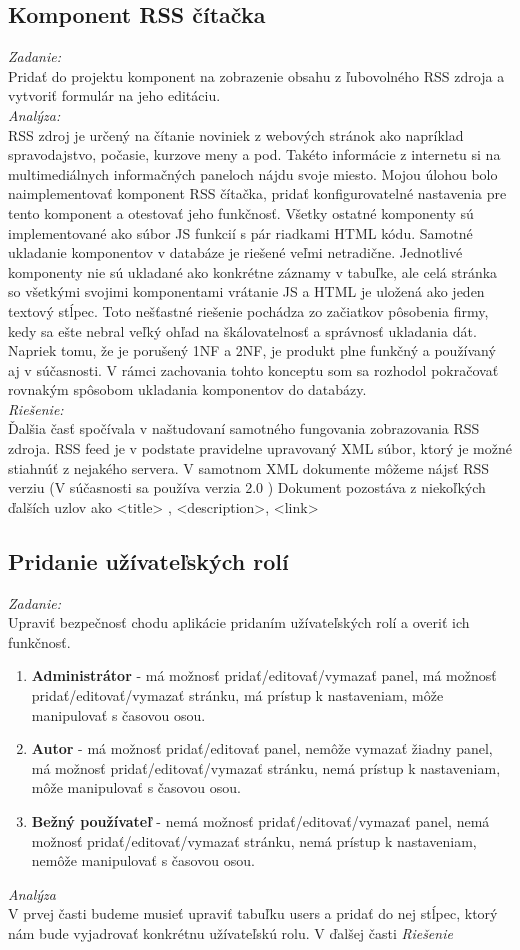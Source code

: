 \documentclass[11pt, oneside]{report}
\begin{document}
\subsection*{Komponent RSS čítačka}
\textit{Zadanie:}\\
Pridať do projektu  komponent na zobrazenie obsahu z ľubovolného RSS zdroja a vytvoriť formulár na jeho editáciu.
\\\textit{Analýza:}\\
 RSS zdroj   je určený na čítanie noviniek  z webových stránok ako napríklad spravodajstvo, počasie, kurzove meny a pod. Takéto informácie  z internetu si na multimediálnych informačných paneloch nájdu svoje miesto. Mojou úlohou bolo naimplementovať komponent RSS čítačka, pridať  konfigurovatelné nastavenia pre tento komponent a otestovať jeho funkčnosť.
Všetky ostatné komponenty sú implementované ako súbor JS funkcií s pár riadkami HTML kódu. Samotné ukladanie komponentov v databáze je riešené veľmi netradične. Jednotlivé komponenty nie sú ukladané ako konkrétne záznamy v tabuľke, ale celá stránka  so všetkými svojimi komponentami vrátanie JS a HTML je uložená ako jeden textový stĺpec. Toto nešťastné riešenie  pochádza  zo začiatkov pôsobenia firmy, kedy sa ešte nebral veľký ohľad na  škálovatelnosť a  správnosť ukladania dát. 
Napriek tomu, že je porušený 1NF a 2NF, je produkt plne funkčný a používaný aj v súčasnosti. V rámci zachovania tohto konceptu som sa rozhodol pokračovať rovnakým spôsobom ukladania komponentov do databázy.
\\\textit{Riešenie:}\\
Ďalšia časť spočívala v naštudovaní samotného fungovania zobrazovania RSS zdroja. RSS feed je v podstate pravidelne upravovaný XML súbor, ktorý je možné stiahnúť z nejakého servera. V samotnom XML dokumente môžeme nájsť RSS verziu (V súčasnosti sa používa verzia 2.0 ) Dokument pozostáva z niekoľkých ďalších uzlov ako <title> , <description>, <link>
\subsection*{Pridanie užívateľských rolí}
\textit{Zadanie:}\\
Upraviť bezpečnosť chodu aplikácie pridaním užívateľských rolí a overiť ich funkčnosť.
\begin{enumerate}
\item \textbf{Administrátor} - má možnosť pridať/editovať/vymazať panel, má možnosť pridať/editovať/vymazať stránku, má prístup k nastaveniam, môže manipulovať s časovou osou.
\item \textbf{Autor} - má možnosť pridať/editovať panel, nemôže vymazať žiadny panel, má možnosť pridať/editovať/vymazať stránku, nemá prístup k nastaveniam, môže manipulovať s časovou osou.
\item \textbf{Bežný používateľ} - nemá možnosť pridať/editovať/vymazať panel, nemá možnosť pridať/editovať/vymazať stránku, nemá prístup k nastaveniam, nemôže manipulovať s časovou osou.
\end{enumerate}
\textit{Analýza}\\
V prvej časti budeme musieť upraviť tabuľku \textsf{users} a pridať do nej stĺpec, ktorý nám bude vyjadrovať konkrétnu užívateľskú rolu. V ďalšej časti 
\textit{Riešenie}\\
\end{document}
